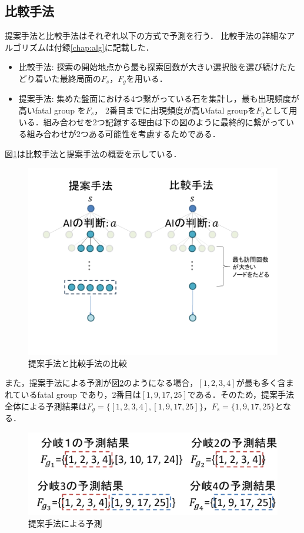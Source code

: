 \subsection{比較手法}
提案手法と比較手法はそれぞれ以下の方式で予測を行う．
比較手法の詳細なアルゴリズムは付録\ref{chap:alg}に記載した．
\newpage
\begin{itemize}
	\item 比較手法: 探索の開始地点から最も探索回数が大きい選択肢を選び続けたたどり着いた最終局面の$F_s， F_g$を用いる．
	\item 提案手法: 集めた盤面における4つ繋がっている石を集計し，最も出現頻度が高いfatal group を$F_s$， 2番目までに出現頻度が高いfatal groupを$F_g$として用いる．組み合わせを2つ記録する理由は下の図のように最終的に繋がっている組み合わせが2つある可能性を考慮するためである．
\end{itemize}
図\ref{fig:compare}は比較手法と提案手法の概要を示している．
\begin{figure}[htbp]
	\centering
	\includegraphics[width=\linewidth]{./figure/compare-image.png}
	\caption{提案手法と比較手法の比較}
	\label{fig:compare}
\end{figure}
また，提案手法による予測が図\ref{fig:g-example}のようになる場合，$[1,2,3,4]$が最も多く含まれているfatal group
であり，2番目は$[1, 9, 17, 25]$である．そのため，提案手法全体による予測結果は$F_g=\{[1, 2, 3, 4], [1, 9, 17, 25]\}， F_s=\{1, 9, 17, 25\}$となる．
\begin{figure}[htbp]
	\centering
	\includegraphics[width=\linewidth]{./figure/g-example.png}
	\caption{提案手法による予測}
	\label{fig:g-example}
\end{figure}

